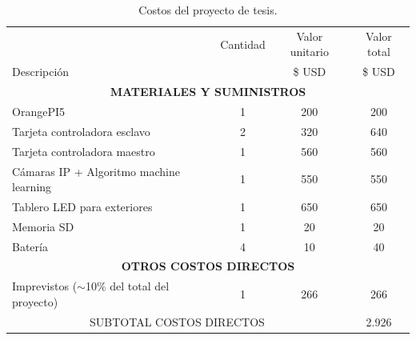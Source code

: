 \documentclass[
11pt, %
]{charter}
\begin{document}
\begin{table}[htpb]
	\centering
	\caption{Costos del proyecto de tesis.}
	\label{tab:presupuesto}
	\small
	\begin{tabularx}{\linewidth}{@{}|X|c|r|r|@{}}
	\hline
	\rowcolor[HTML]{C0C0C0} 
	\multicolumn{4}{|c|}{\cellcolor[HTML]{C0C0C0}COSTOS DIRECTOS} \\ \hline
	\rowcolor[HTML]{C0C0C0} 
	 &
	  \multicolumn{1}{c|}{\cellcolor[HTML]{C0C0C0}Cantidad} &
	  \multicolumn{1}{c|}{\cellcolor[HTML]{C0C0C0}Valor unitario} &
	  \multicolumn{1}{c|}{\cellcolor[HTML]{C0C0C0}Valor total} \\ 
	\rowcolor[HTML]{C0C0C0} Descripción  &
	  \multicolumn{1}{c|}{\cellcolor[HTML]{C0C0C0}} &
	  \multicolumn{1}{c|}{\cellcolor[HTML]{C0C0C0} \$ USD} &
	  \multicolumn{1}{c|}{\cellcolor[HTML]{C0C0C0} \$ USD} \\ \hline
	  
	\multicolumn{4}{|c|}{\textbf{MATERIALES Y SUMINISTROS}}\\ \hline
	OrangePI5 	& \multicolumn{1}{c|}{	1	} & \multicolumn{1}{c|}{	200	} &  \multicolumn{1}{c|}{	200	} \\ \hline
	Tarjeta controladora esclavo	& \multicolumn{1}{c|}{	2	} & \multicolumn{1}{c|}{	320	} &  \multicolumn{1}{c|}{	640	} \\ \hline
	Tarjeta controladora maestro		& \multicolumn{1}{c|}{	1	} & \multicolumn{1}{c|}{	560	} &  \multicolumn{1}{c|}{	560	} \\ \hline
	Cámaras	IP + Algoritmo machine learning		& \multicolumn{1}{c|}{	1	} & \multicolumn{1}{c|}{	550	} &  \multicolumn{1}{c|}{	550	} \\ \hline
	Tablero LED para exteriores			& \multicolumn{1}{c|}{	1	} & \multicolumn{1}{c|}{	650	} &  \multicolumn{1}{c|}{	650	} \\ \hline
	Memoria SD			& \multicolumn{1}{c|}{	1	} & \multicolumn{1}{c|}{	20	} &  \multicolumn{1}{c|}{	20	} \\ \hline
	Batería					& \multicolumn{1}{c|}{	4	} & \multicolumn{1}{c|}{	10	} &  \multicolumn{1}{c|}{	40	} \\ \hline

	
	\multicolumn{4}{|c|}{\textbf{OTROS COSTOS DIRECTOS}}\\ \hline
	Imprevistos	($\sim$10\% del total del  proyecto)				& \multicolumn{1}{c|}{	1	} & \multicolumn{1}{c|}{	266	} &  \multicolumn{1}{c|}{	266	} \\ \hline
	
	\multicolumn{3}{|c|}{SUBTOTAL COSTOS DIRECTOS} & \multicolumn{1}{c|}{ 2.926 } \\ \hline
	

\end{tabularx}
\end{table}
\end{document}
